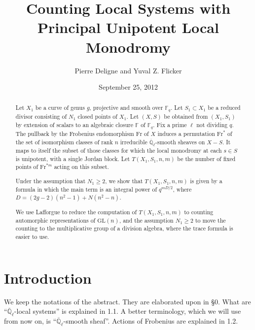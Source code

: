 \documentclass[11pt,a4paper]{article}
\theoremstyle{plain}
\theoremstyle{definition}
\newcommand{\Ql}{\overline{\mathbb{Q}}_\ell}
\newcommand{\Fq}{\mathbb{F}_q}
\newcommand{\F}{\mathbb{F}}
\newcommand{\GL}{\mathrm{GL}}
\newcommand{\Fr}{\mathrm{Fr}}
\begin{document}
\title{Counting Local Systems with Principal Unipotent Local Monodromy}
\author{Pierre Deligne and Yuval Z. Flicker}
\date{September 25, 2012}
\maketitle

\begin{abstract}
Let $X_1$ be a curve of genus $g$, projective and smooth over $\Fq$. Let $S_1 \subset X_1$ be a reduced divisor consisting of $N_1$ closed points of $X_1$. Let $(X,S)$ be obtained from $(X_1,S_1)$ by extension of scalars to an algebraic closure $\F$ of $\Fq$. Fix a prime $\ell$ not dividing $q$. The pullback by the Frobenius endomorphism $\Fr$ of $X$ induces a permutation $\Fr^*$ of the set of isomorphism classes of rank $n$ irreducible $\Ql$-smooth sheaves on $X - S$. It maps to itself the subset of those classes for which the local monodromy at each $s \in S$ is unipotent, with a single Jordan block. Let $T(X_1,S_1,n,m)$ be the number of fixed points of $\Fr^{*m}$ acting on this subset.

Under the assumption that $N_1 \geq 2$, we show that $T(X_1,S_1,n,m)$ is given by a formula in which the main term is an integral power of $q^{mD/2}$, where $D = (2g-2)(n^2-1) + N(n^2-n)$.

We use Lafforgue to reduce the computation of $T(X_1,S_1,n,m)$ to counting automorphic representations of $\GL(n)$, and the assumption $N_1 \geq 2$ to move the counting to the multiplicative group of a division algebra, where the trace formula is easier to use.
\end{abstract}

\tableofcontents

\section*{Introduction}

We keep the notations of the abstract. They are elaborated upon in \S 0. What are ``$\Ql$-local systems'' is explained in 1.1. A better terminology, which we will use from now on, is ``$\Ql$-smooth sheaf''. Actions of Frobenius are explained in 1.2.
\end{document}
